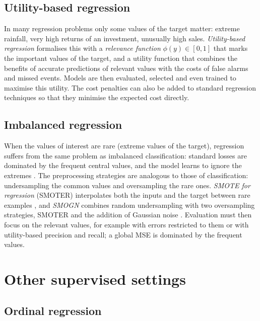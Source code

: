 \subsection{Utility-based regression}

In many regression problems only some values of the target matter: extreme rainfall,
very high returns of an investment, unusually high sales. \emph{Utility-based regression}
\citep{torgo2007utility} formalises this with a \emph{relevance function} $\phi(y)\in[0,1]$ that
marks the important values of the target, and a utility function that combines the benefits of
accurate predictions of relevant values with the costs of false alarms and missed events.
Models are then evaluated, selected and even trained to maximise this utility. The cost penalties can also be added to standard regression
techniques so that they minimise the expected cost directly.

\subsection{Imbalanced regression}

When the values of interest are rare (extreme values of the target), regression suffers from
the same problem as imbalanced classification: standard losses are dominated by the frequent
central values, and the model learns to ignore the extremes \citep{branco2016survey}. The
preprocessing strategies are analogous to those of classification: undersampling the common
values and oversampling the rare ones. \emph{SMOTE for regression} (SMOTER) interpolates both
the inputs and the target between rare examples \citep{torgo2013smote}, and \emph{SMOGN}
combines random undersampling with two oversampling strategies, SMOTER and the addition of
Gaussian noise \citep{branco2017smogn}. Evaluation must then focus on the relevant values, for
example with errors restricted to them or with utility-based precision and recall; a global MSE is dominated by the frequent values.

\section{Other supervised settings\extsec}\label{sec:other}

\subsection{Ordinal regression}

